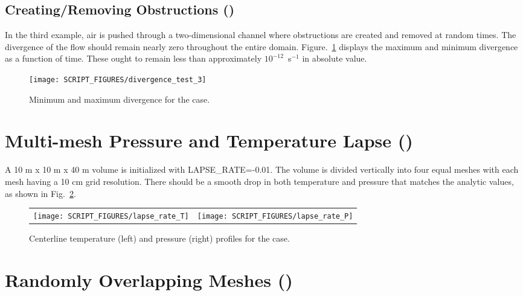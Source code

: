 \documentclass[11pt]{book}
\begin{document}
\subsection{Creating/Removing Obstructions (\texorpdfstring{}{divergence\_test\_3})}
\label{divergence_test_3}

In the third example, air is pushed through a two-dimensional channel where obstructions are created and removed at random times. The divergence of the flow should remain nearly zero throughout the entire domain. Figure.~\ref{divergence_test_3_fig} displays the maximum and minimum divergence as a function of time. These ought to remain less than approximately $10^{-12}$~s$^{-1}$ in absolute value.

\begin{figure}[!ht]
\centering
\texttt{[image: SCRIPT\_FIGURES/divergence\_test\_3]}
\caption[The  case 3]{Minimum and maximum divergence for the  case.}
\label{divergence_test_3_fig}
\end{figure}



\newpage

\section{Multi-mesh Pressure and Temperature Lapse (\texorpdfstring{}{lapse\_rate})}
\label{lapse_rate}

A 10 m x 10 m x 40 m volume is initialized with {\ct LAPSE\_RATE=-0.01}.  The volume is divided vertically into four equal meshes with each mesh having a 10 cm grid resolution.  There should be a smooth drop in both temperature and pressure that matches the analytic values, as shown in Fig.~\ref{lapse_rate_fig}.

\begin{figure}[!ht]
\begin{tabular*}{\textwidth}{lr}
\texttt{[image: SCRIPT\_FIGURES/lapse\_rate\_T]} &
\texttt{[image: SCRIPT\_FIGURES/lapse\_rate\_P]}
\end{tabular*}
\caption[The  test case]{Centerline temperature (left) and pressure (right) profiles for the  case.}
\label{lapse_rate_fig}
\end{figure}


\newpage

\section{Randomly Overlapping Meshes (\texorpdfstring{}{random\_meshes})}
\label{random_meshes}
\end{document}
